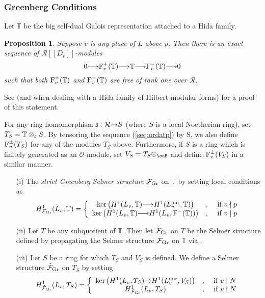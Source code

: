 \documentclass[12pt]{amsart}
\numberwithin{equation}{section}
\newenvironment{define}{\par\medskip\noindent\refstepcounter{thm}
\bgroup{\hspace*{-0.15 cm}\bf{Definition}
\thethm.}\bgroup}{\egroup \egroup\par\medskip}
\newtheorem{prop}[thm]{Proposition}
\begin{document}
\subsubsection{Greenberg Conditions}
Let ${\mathbb{T}}$ be the big self-dual Galois representation attached to a Hida family.
\begin{prop}
\label{prop:ordatp}
Suppose $v$ is any place of $L$ above $p$. Then there is an exact sequence of ${\mathcal{R}}[[D_v]]$-modules
\begin{equation}\label{seq:ordatp}0{\longrightarrow} \textup{F}^+_v({\mathbb{T}}){\longrightarrow} {\mathbb{T}} {\longrightarrow} \textup{F}^-_v({\mathbb{T}}){\longrightarrow} 0\end{equation}
 such that both $\textup{F}^+_v({\mathbb{T}})$ and $\textup{F}^-_v({\mathbb{T}})$ are free of rank one over ${\mathcal{R}}$.
\end{prop}
See \cite[Prop. 2.4.1]{howard} (and \cite[\S12.7.8-10]{nek} when dealing with a Hida family of Hilbert modular forms) for a proof of this statement.

For any ring homomorphism $\frak{s}:{\mathcal{R}}{\rightarrow} S$ (where $S$ is a local Noetherian ring), set $T_S={\mathbb{T}}\otimes_\frak{s}S$. By tensoring the sequence (\ref{seq:ordatp}) by S, we also define $\textup{F}^\pm_v(T_S)$ for any of the modules $T_S$ above. Furthermore, if $S$ is a ring which is finitely generated as an ${\mathcal{O}}$-module, set $V_S=T_S\otimes_\ooE$ and define $\textup{F}^\pm_v(V_S)$ in a similar manner.
\begin{define}
\label{def:grlocal}
\begin{itemize}
\item[(i)] The \emph{strict Greenberg Selmer structure} ${\mathcal{F}}_{\textup{Gr}}$ on ${\mathbb{T}}$ by setting local conditions as
$$H^1_{{\mathcal{F}}_{\textup{Gr}}}(L_v,{\mathbb{T}})=\left\{\begin{array}{ccr}
\ker\left(H^1(L_v,{\mathbb{T}}){\longrightarrow} H^1(L_v^{\textup{unr}},{\mathbb{T}})\right)&,& \hbox{ if } v\nmid p\\
\ker\left(H^1(L_v,{\mathbb{T}}){\longrightarrow} H^1(L_v,\textup{F}^-({\mathbb{T}}))\right)&,& \hbox{ if } v\mid p
\end{array}
\right.$$
\item[(ii)] Let $T$ be any subquotient of ${\mathbb{T}}$. Then let  ${\mathcal{F}}_{\textup{Gr}}$ on $T$ be the Selmer structure defined by propagating the Selmer structure ${\mathcal{F}}_{\textup{Gr}}$ on ${\mathbb{T}}$ via \cite[Example 1.1.2]{mr02}.
\item[(iii)] Let $S$ be a ring for which $T_S$ and $V_S$ is defined. We define a Selmer structure $\tilde{\mathcal{F}}_{\textup{Gr}}$ on $T_S$ by setting
$$H^1_{\tilde{\mathcal{F}}_{\textup{Gr}}}(L_v,T_S)=\left\{\begin{array}{ccr}
\ker\left(H^1(L_v,T_S){\rightarrow} H^1(L_v^{\textup{unr}},V_S)\right)&,& \hbox{ if } v\mid N\\
H^1_{{\mathcal{F}}_{\textup{Gr}}}(L_v,T_S)&,& \hbox{ if } v\nmid N
\end{array}
\right.$$
\end{itemize}
\end{define}
\end{document}
